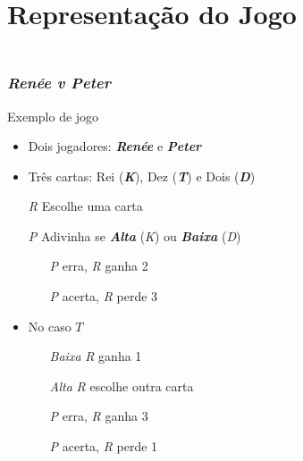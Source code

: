 \section{Representação do Jogo}

\begin{frame}
\frametitle{\secname\\\emph{Renée v Peter}}
Exemplo de jogo
\begin{itemize}
	\item Dois jogadores: \textbf{\emph{Renée}} e \textbf{\emph{Peter}}
	\pause
	\item Três cartas: Rei (\textbf{\emph{K}}), Dez (\textbf{\emph{T}}) e Dois (\textbf{\emph{D}})
	\pause
	\item[\emph{R}] Escolhe uma carta
	\pause
	\item[\emph{P}] Adivinha se \emph{\textbf{Alta}} (\emph{K}) ou \emph{\textbf{Baixa}} (\emph{D})
	\pause
	\begin{itemize}
		\item[\emph{P}] erra, \emph{R} ganha 2
		\pause
		\item[\emph{P}] acerta, \emph{R} perde 3
	\end{itemize}
	\pause
	\item No caso $T$
	\pause
	\begin{itemize}
		\item[\emph{Baixa}] \emph{R} ganha 1
		\pause
		\item[\emph{Alta}] \emph{R} escolhe outra carta
	\end{itemize}
	\pause
	\begin{itemize}
		\item[\emph{P}] erra, \emph{R} ganha 3
		\pause
		\item[\emph{P}] acerta, \emph{R} perde 1
	\end{itemize}
\end{itemize}
\end{frame}

